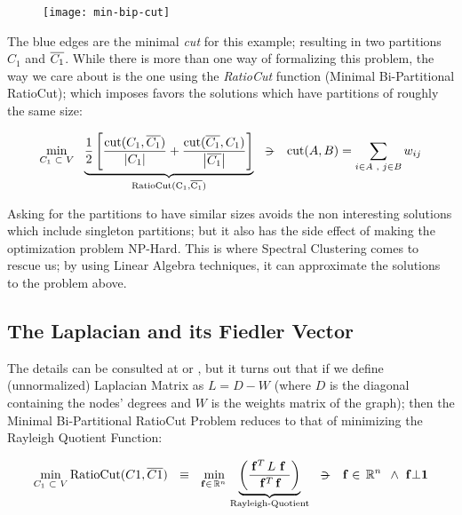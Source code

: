 \begin{figure}[H]
  \label{min-bip-cut}
  \centering
  \texttt{[image: min-bip-cut]}
\end{figure}

The blue edges are the minimal \emph{cut} for this example; resulting
in two partitions $C_1$ and $\overline{C_1}$. While there is more than
one way of formalizing this problem, the way we care about is the one
using the \emph{RatioCut} function (Minimal Bi-Partitional RatioCut);
which imposes favors the solutions which have partitions of roughly
the same size: 

\begin{equation*}
  \min\limits_{\tiny{C_1 \ds{\subset} V}} \ds{}
  \underbrace{      
    \frac{1}{2}
    \left[
      \dfrac{\func{cut}(C_1,\stcomp{C_1})}{\abs{C_1}} +
      \dfrac{\func{cut}(\stcomp{C_1},C_1)}{\abs{\stcomp{C_1}}}
      \right]
  }_{\func{RatioCut(C_1,\stcomp{C_1})}}
  \ds{\suchthat}
  \func{cut}(A,B) = \sum\limits_{\tiny{i \in A \ds{,} j \in B}} w_{ij}
\end{equation*}
\joinbelow{1cm}

Asking for the partitions to have similar sizes avoids the non
interesting solutions which include singleton partitions; but it also
has the side effect of making the optimization problem NP-Hard. This
is where Spectral Clustering comes to rescue us; by using Linear
Algebra techniques, it can approximate the solutions to the problem
above.

\subsection{The Laplacian and its Fiedler Vector}
The details can be consulted at \cite{luxburg07} or
\cite{gao13}, but it turns out that if we define (unnormalized)
Laplacian Matrix as $L = D - W$ (where $D$ is the diagonal containing
the nodes' degrees and $W$ is the weights matrix of the graph); then
the Minimal Bi-Partitional RatioCut Problem reduces to that of minimizing the
Rayleigh Quotient Function:

\begin{equation*}
\min\limits_{C_1 \ds{\subset} V} \func{RatioCut}(C1,\stcomp{C1})
\ds{\ds{\equiv}}
\min\limits_{\vec{f} \in \R{n}}
  \underbrace{
    \left(\dfrac{\trans{\vec{f}} L \ds{\vec{f}}}{\trans{\vec{f}} \vec{f}}\right)
  }_{\text{Rayleigh-Quotient}}    
\ds{\suchthat}
\vec{f} \in \R{n} \ds{\land} \vec{f} \bot \vec{1}
\end{equation*}
\joinbelow{1cm}

